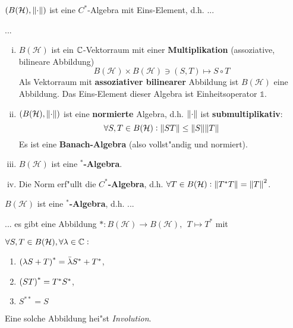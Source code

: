 \documentclass[9pt]{article}
\newcommand{\C}[1]{%
	\ifthenelse{\equal{#1}{}}
	{\mathbb{C}}
	{\mathbb{C}^{#1}}}%
\newcommand{\Hi}{\mathcal{H}}
\newenvironment{field}{}{\newpage}
\newif\ifnote
\newenvironment{note}{\notetrue}{\notefalse}
\newcommand{\localtag}{}
\newcommand{\globaltag}{}
\newcommand{\uuid}{}
\newcommand{\tags}[1]{
    \ifnote 
        \renewcommand{\localtag}{#1}
    \else
        \renewcommand{\globaltag}{#1}
    \fi 
    }
\newcommand{\xplain}[1]{\renewcommand{\uuid}{#1}}
\begin{document}
	\begin{note}
		\xplain{UUID}
		\tags{6.2.2}
		
		\begin{field}  %
			$(B(\Hi), \norm{\cdot})$ ist eine $C^*$-Algebra mit Eins-Element, d.h. ...
		\end{field}
		
		\begin{field}  %
			...
			\footnotesize
			\begin{enumerate}[i)]
				\item $B(\Hi)$ ist ein $\C{}$-Vektorraum mit einer \textbf{Multiplikation} (assoziative, bilineare Abbildung)
				\begin{equation*}
					B(\Hi) \times B(\Hi) \ni (S,T) \mapsto S \circ T
				\end{equation*}
				Als Vektorraum mit \textbf{assoziativer bilinearer} Abbildung 
				ist $B(\Hi)$ eine Abbildung. Das Eins-Element dieser Algebra ist Einheitsoperator $\mathbb{1}$.
				\item $(B(\Hi), \norm{\cdot})$ ist eine \textbf{normierte} Algebra, d.h. $\norm{\cdot}$ ist \textbf{submultiplikativ}:
				\begin{equation*}
					\forall S,T \in B(\Hi): \norm{ST} \leq \norm{S} \norm{T}
				\end{equation*}
				Es ist eine \textbf{Banach-Algebra} (also vollst"andig und normiert).
				\item $B(\Hi)$ ist eine \textbf{$^*$-Algebra}.
				\item Die Norm erf"ullt die \textbf{${C^*}$-Algebra}, d.h. $\forall T \in B(\Hi): \norm{T^*T} = \norm{T}^2$.
			\end{enumerate}
		\end{field}
			
		\begin{field}  %
			$B(\Hi)$ ist eine \textbf{$^*$-Algebra}, d.h. ...
		\end{field}
		
		\begin{field}  %
			... es gibt eine Abbildung $*: B(\Hi) \rightarrow B(\Hi), \ \ T\mapsto T^*$ mit
			
			$\forall S,T \in B(\Hi), \forall \lambda \in \C{}:$
			\begin{enumerate}
				\item $\qty(\lambda S + T)^* = \bar{\lambda}S^* + T^*$,
				\item $\qty(ST)^* = T^*S^*$,
				\item $S^{**} = S$
			\end{enumerate}
		Eine solche Abbildung hei"st \textit{Involution}.
		\end{field}
	\end{note}
\end{document}
